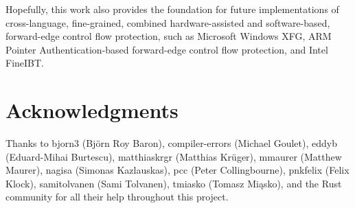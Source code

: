\documentclass{article}
\begin{document}
Hopefully, this work also provides the foundation for future implementations of cross-language, fine-grained, combined hardware-assisted and software-based, forward-edge control flow protection, such as Microsoft Windows XFG, ARM Pointer Authentication-based forward-edge control flow protection, and Intel FineIBT.


\section{Acknowledgments}

Thanks to bjorn3 (Björn Roy Baron), compiler-errors (Michael Goulet), eddyb (Eduard-Mihai Burtescu), matthiaskrgr (Matthias Krüger), mmaurer (Matthew Maurer), nagisa (Simonas Kazlauskas), pcc (Peter Collingbourne), pnkfelix (Felix Klock), samitolvanen (Sami Tolvanen), tmiasko (Tomasz Miąsko), and the Rust community for all their help throughout this project.
\end{document}
